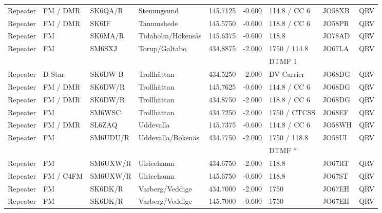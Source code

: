 \begin{landscape}
\begin{longtable}{llllrrlll}
Repeater & FM / DMR  & SK6QA/R  & Stenungsund       & 145.7125     & -0.600     & 114.8 / CC 6 & JO58XB      & QRV      \\
Repeater & FM / DMR  & SK6IF    & Tanumshede        & 145.5750     & -0.600     & 118.8 / CC 6 & JO58PR      & QRV      \\
Repeater & FM        & SK6MA/R  & Tidaholm/Hökensås & 145.6375     & -0.600     & 118.8        & JO78AD      & QRV      \\
Repeater & FM        & SM6SXJ   & Torup/Galtabo     & 434.8875     & -2.000     & 1750 / 114.8 & JO67LA      & QRV      \\
         &           &          &                   &              &            & DTMF 1       &             &          \\
Repeater & D-Star    & SK6DW-B  & Trollhättan       & 434.5250     & -2.000     & DV Carrier   & JO68DG      & QRV      \\
Repeater & FM / DMR  & SK6DW/R  & Trollhättan       & 145.7625     & -0.600     & 114.8 / CC 6 & JO68DG      & QRV      \\
Repeater & FM / DMR  & SK6DW/R  & Trollhättan       & 434.8750     & -2.000     & 118.8 / CC 6 & JO68DG      & QRV      \\
Repeater & FM        & SM6WSC   & Trollhättan       & 434.7250     & -2.000     & 1750 / CTCSS & JO68EF      & QRV      \\
Repeater & FM / DMR  & SL6ZAQ   & Uddevalla         & 145.7375     & -0.600     & 114.8 / CC 6 & JO58WH      & QRV      \\
Repeater & FM        & SM6UDU/R & Uddevalla/Bokenäs & 434.7750     & -2.000     & 1750 / 118.8 & JO58UI      & QRV      \\
         &           &          &                   &              &            & DTMF *       &             &          \\
Repeater & FM        & SM6UXW/R & Ulricehamn        & 434.6750     & -2.000     & 118.8        & JO67RT      & QRV      \\
Repeater & FM / C4FM & SM6UXW/R & Ulricehamn        & 145.6750     & -0.600     & 118.8        & JO67ST      & QRV      \\
Repeater & FM        & SK6DK/R  & Varberg/Veddige   & 434.7000     & -2.000     & 1750         & JO67EH      & QRV      \\
Repeater & FM        & SK6DK/R  & Varberg/Veddige   & 145.7000     & -0.600     & 1750         & JO67EH      & QRV      \\

\end{longtable}
\end{landscape}
